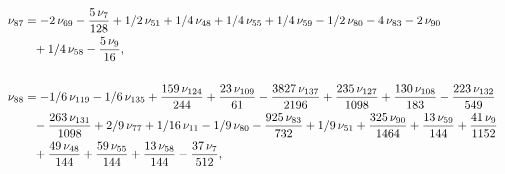 \documentclass[a4paper,12pt, DIV=14, BCOR=5mm, twoside, headsepline, numbers=noenddot]{scrbook}
\begin{document}
\begin{align}
\begin{aligned}
\\
\nu_{{87}}&=-2\,\nu_{{69}}-{\frac {5\,\nu_{{7}}}{128}}+1/2\,\nu_{{51}}
+1/4\,\nu_{{48}}+1/4\,\nu_{{55}}+1/4\,\nu_{{59}}-1/2\,\nu_{{80}}-4\,
\nu_{{83}}-2\,\nu_{{90}}\\
 &\hphantom{=}+1/4\,\nu_{{58}}-{\frac {5\,\nu_{{9}}}{16}},\\
\\
\nu_{{88}}&=-1/6\,\nu_{{119}}-1/6\,\nu_{{135}}+{\frac {159\,\nu_{{124}}
}{244}}+{\frac {23\,\nu_{{109}}}{61}}-{\frac {3827\,\nu_{{137}}}{2196}
}+{\frac {235\,\nu_{{127}}}{1098}}+{\frac {130\,\nu_{{108}}}{183}}-{
\frac {223\,\nu_{{132}}}{549}}\\
 &\hphantom{=}-{\frac {263\,\nu_{{131}}}{1098}}+2/9\,
\nu_{{77}}+1/16\,\nu_{{11}}-1/9\,\nu_{{80}}-{\frac {925\,\nu_{{83}}}{
732}}+1/9\,\nu_{{51}}+{\frac {325\,\nu_{{90}}}{1464}}+{\frac {13\,\nu_
{{59}}}{144}}+{\frac {41\,\nu_{{9}}}{1152}}\\
 &\hphantom{=}+{\frac {49\,\nu_{{48}}}{
144}}+{\frac {59\,\nu_{{55}}}{144}}+{\frac {13\,\nu_{{58}}}{144}}-{
\frac {37\,\nu_{{7}}}{512}}, 
\end{aligned}
\end{align}
\end{document}
